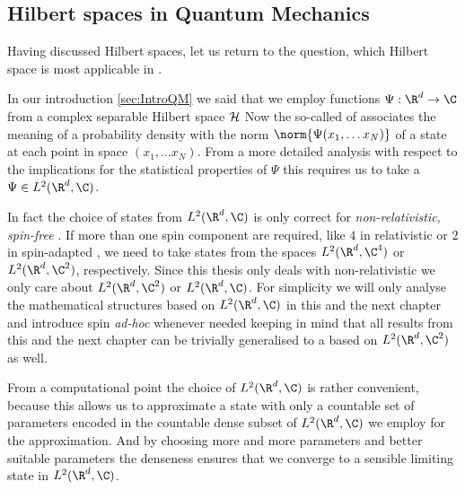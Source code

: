 \subsection{Hilbert spaces in Quantum Mechanics}

Having discussed Hilbert spaces, let us return to the question,
which Hilbert space is most applicable in \QM.

In our introduction \vref{sec:IntroQM} we said that
we employ functions $\Psi : \R^d \to \C$ from a
complex separable Hilbert space $\mathcal{H}$
Now the so-called  of \QM
associates the meaning of a probability density
with the norm $\norm{\Psi(x_1, \ldots x_N)}$
of a state at each point in space $(x_1, \ldots x_N)$.
From a more detailed analysis with respect to the implications
for the statistical properties of $\Psi$
this requires us to take a $\Psi \in L^2(\R^d, \C)$.

In fact the choice of states from $L^2(\R^d, \C)$
is only correct for \emph{non-relativistic, spin-free} \QM.
If more than one spin component are required,
like $4$ in relativistic \QM or $2$ in spin-adapted \QM,
we need to take states from the spaces $L^2(\R^d, \C^4)$ or $L^2(\R^d, \C^2)$,
respectively.
Since this thesis only deals with non-relativistic \QM
we only care about $L^2(\R^d, \C^2)$ or $L^2(\R^d, \C)$.
For simplicity we will only analyse the mathematical structures
based on $L^2(\R^d, \C)$ in this and the next chapter
and introduce spin \textit{ad-hoc} whenever needed
keeping in mind that all results from this and the next chapter
can be trivially generalised to a \QM based on $L^2(\R^d, \C^2)$ as well.

From a computational point the choice of $L^2(\R^d, \C)$ is rather convenient,
because this allows us to approximate a \QM state with only a countable
set of parameters
encoded in the countable dense subset of $L^2(\R^d, \C)$ we employ for the
approximation.
And by choosing more and more parameters and better suitable parameters
the denseness ensures that we converge to a sensible limiting state
in $L^2(\R^d, \C)$.

